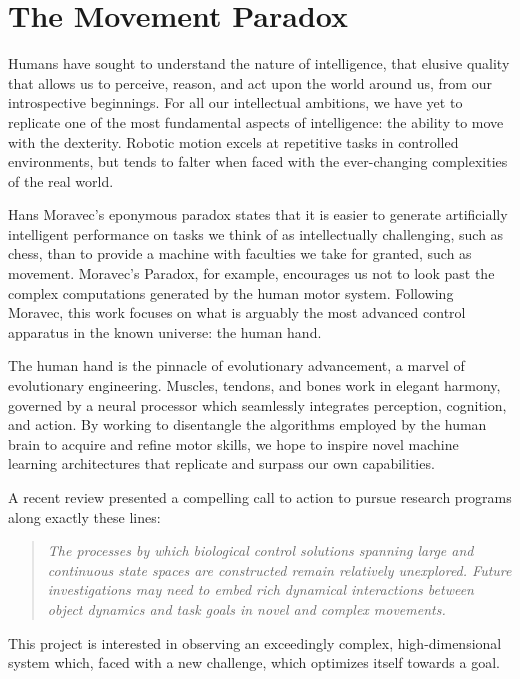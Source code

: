 \documentclass[../main.tex]{subfiles}
\begin{document}
\section{The Movement Paradox}

Humans have sought to understand the nature of intelligence, that elusive quality that allows us to perceive, reason, and act upon the world around us, from our introspective beginnings. For all our intellectual ambitions, we have yet to replicate one of the most fundamental aspects of intelligence: the ability to move with the dexterity. Robotic motion excels at repetitive tasks in controlled environments, but tends to falter when faced with the ever-changing complexities of the real world. 

Hans Moravec's eponymous paradox states that it is easier to generate artificially intelligent performance on tasks we think of as intellectually challenging, such as chess, than to provide a machine with faculties we take for granted, such as movement. Moravec's Paradox, for example, encourages us not to look past the complex computations generated by the human motor system. Following Moravec, this work focuses on what is arguably the most advanced control apparatus in the known universe: the human hand. 

The human hand is the pinnacle of evolutionary advancement, a marvel of evolutionary engineering. Muscles, tendons, and bones work in elegant harmony, governed by a neural processor which seamlessly integrates perception, cognition, and action. By working to disentangle the algorithms employed by the human brain to acquire and refine motor skills, we hope to inspire novel machine learning architectures that replicate and surpass our own capabilities.

A recent review presented a compelling call to action to pursue research programs along exactly these lines:
%
\begin{quote}
  \textit{The processes by which biological control solutions spanning large and continuous state spaces are constructed remain relatively unexplored. Future investigations may need to embed rich dynamical interactions between object dynamics and task goals in novel and complex movements\cite{McNamee2019}.}
\end{quote}
%
This project is interested in observing an exceedingly complex, high-dimensional system which, faced with a new challenge, which optimizes itself towards a goal.
\end{document}

